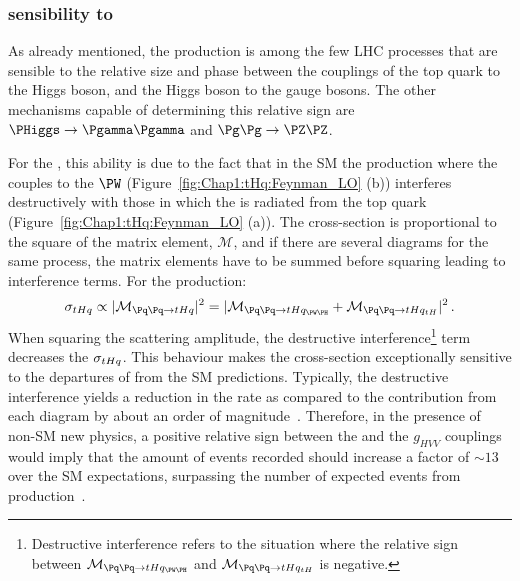 \subsubsection{\tHq sensibility to \yt}
\label{sec:Chap1:tH:SensibilityToYukawa}
As already mentioned, the \tHq production is among the few LHC processes that are 
sensible to the relative size and phase between
the couplings of the top quark to the Higgs boson, and the Higgs boson to the gauge bosons. 
The other mechanisms capable of determining this relative sign 
are $\PHiggs \rightarrow \Pgamma \Pgamma$ and $\Pg \Pg \rightarrow \PZ \PZ$.

For the \tHq, this ability is due to the fact that in the SM the \tHq production where 
the \PHiggs couples to the $\PW$ (Figure~\ref{fig:Chap1:tHq:Feynman_LO} (b)) interferes 
destructively with those in which the \PH is radiated from the top quark (Figure~\ref{fig:Chap1:tHq:Feynman_LO} (a)). 
The cross-section is 
proportional to the square of the matrix element, $\mathcal{M}$, and if there are several diagrams 
for the same process, the matrix elements have to be summed before squaring leading to interference terms. For the \tHq production:
\begin{equation}\label{eq:Chap1:sigmathqM}
	\sigma_{\tHq} \propto |\mathcal{M}_{\Pq \Pq \rightarrow \tHq}|^{2} = | \mathcal{M}_{\Pq \Pq \rightarrow \tHq_{\PW \PH}} + \mathcal{M}_{\Pq \Pq \rightarrow \tHq_{tH}} |^{2} \, .
\end{equation}
When squaring the scattering amplitude, the destructive interference\footnote{Destructive interference refers to 
the situation where the relative sign between $\mathcal{M}_{\Pq \Pq \rightarrow \tHq_{\PW \PH}}$ and 
$\mathcal{M}_{\Pq \Pq \rightarrow \tHq_{tH}}$ 
is negative.} term decreases the $\sigma_{tHq}$. 
This behaviour makes the \tHq cross-section exceptionally sensitive to the departures of \yt from the SM predictions. 
Typically, the destructive interference yields a reduction in the rate as compared to the
contribution from each diagram by about an order of magnitude~\cite{Tait:2000sh}.
Therefore, in the presence of non-SM new physics, a positive relative sign between the \yt and the $g_{HVV}$ couplings would imply that the
amount of \tHq events recorded should increase a factor of $\sim 13$ over the SM expectations, 
surpassing the number of expected events from \ttH production~\cite{Biswas:2013xva}.

